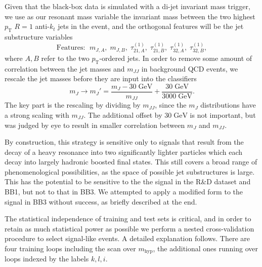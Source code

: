 \documentclass[a4paper,11pt]{article}
\begin{document}
Given that the black-box data is simulated with a di-jet invariant mass trigger, we use as our resonant mass variable the invariant mass between the two highest $p_\text{T}$ $R=1$ anti-$k_t$ jets in the event, and the orthogonal features will be the jet substructure variables
\begin{equation}
    \mathrm{Features:} ~~ m_{J, A}, \; m_{J, B}, \; \tau_{21, A}^{(1)}, \; \tau_{21, B}^{(1)}, \; \tau_{32, A}^{(1)}, \; \tau_{32, B}^{(1)},
\end{equation}
where $A, B$ refer to the two $p_\text{T}$-ordered jets. In order to remove some amount of correlation between the jet masses and $m_{JJ}$ in background QCD events, we rescale the jet masses before they are input into the classifiers
\begin{equation}
    m_J \rightarrow m_J' = \frac{m_J-30\;\text{GeV}}{m_{JJ}} + \frac{30 \; \text{GeV}}{3000 \; \text{GeV}}.
\end{equation}
The key part is the rescaling by dividing by $m_{JJ}$, since the $m_J$ distributions have a strong scaling with $m_{JJ}$. The additional offset by $30\;\text{GeV}$ is not important, but was judged by eye to result in smaller correlation between $m_J$ and $m_{JJ}$.

By construction, this strategy is sensitive only to signals that result from the decay of a heavy resonance into two significantly lighter particles which each decay into largely hadronic boosted final states. This still covers a broad range of phenomenological possibilities, as the space of possible jet substructures is large. This has the potential to be sensitive to the the signal in the R\&D dataset and BB1, but not to that in BB3. We attempted to apply a modified form to the signal in BB3 without success, as briefly described at the end.

The statistical independence of training and test sets is critical, and in order to retain as much statistical power as possible we perform a nested cross-validation procedure to select signal-like events. A detailed explanation follows. There are four training loops including the scan over $m_{\text{hyp}}$, the additional ones running over loops indexed by the labels $k, l, i$.
\end{document}
